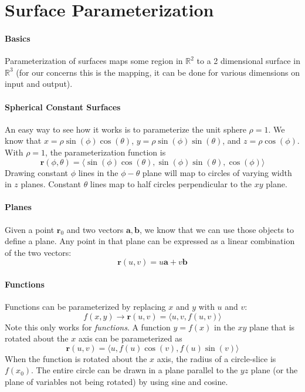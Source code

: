 \documentclass{article}
\begin{document}
\section*{Surface Parameterization}
\paragraph{Basics} Parameterization of surfaces maps some region in $\mathbb{R}^2$ to a 2 dimensional surface in $\mathbb{R}^3$ (for our concerns this is the mapping, it can be done for various dimensions on input and output). 
\paragraph{Spherical Constant Surfaces} An easy way to see how it works is to parameterize the unit sphere $\rho = 1$. We know that $x = \rho\sin(\phi)\cos(\theta)$, $y=\rho \sin(\phi)\sin(\theta)$, and $z = \rho \cos(\phi)$. With $\rho = 1$, the parameterization function is
\[ \mathbf{r}(\phi, \theta) = \langle \sin(\phi)\cos(\theta), \sin(\phi)\sin(\theta), \cos(\phi) \rangle \]
Drawing constant $\phi$ lines in the $\phi-\theta$ plane will map to circles of varying width in $z$ planes. Constant $\theta$ lines map to half circles perpendicular to the $xy$ plane.

\paragraph{Planes} Given a point $\mathbf{r}_0$ and two vectors $\mathbf{a,b}$, we know that we can use those objects to define a plane. Any point in that plane can be expressed as a linear combination of the two vectors:
\[ \mathbf{r}(u,v) = u\mathbf{a} + v\mathbf{b} \]

\paragraph{Functions} Functions can be parameterized by replacing $x$ and $y$ with $u$ and $v$:
\[ f(x,y) \rightarrow \mathbf{r}(u,v) = \langle u,v, f(u,v) \rangle \]
Note this only works for \textit{functions}. A function $y=f(x)$ in the $xy$ plane that is rotated about the $x$ axis can be parameterized as
\[ \mathbf{r}(u,v) = \langle u, f(u)\cos(v), f(u)\sin(v) \rangle \]
When the function is rotated about the $x$ axis, the radius of a circle-slice is $f(x_0)$. The entire circle can be drawn in a plane parallel to the $yz$ plane (or the plane of variables not being rotated) by using sine and cosine.
\end{document}
